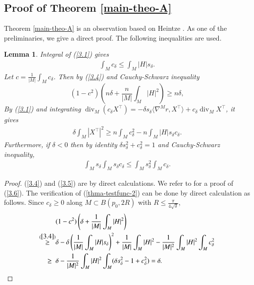\documentclass{amsart}
\numberwithin{equation}{section}
\newtheorem{lem}[theo]{Lemma}
\theoremstyle{remark}
\renewcommand{\(}{\left(}
\renewcommand{\)}{\right)}
\renewcommand{\~}{\tilde}
\renewcommand{\-}{\overline}
\renewcommand{\d}{\delta}
\newcommand{\divv}{\operatorname{div }}
\begin{document}
\subsection{Proof of Theorem \ref{main-theo-A}}

Theorem \ref{main-theo-A} is an observation based on Heintze \cite{Heintze1988}. As one of the preliminaries, we give a direct proof. The following inequalities are used.
\begin{lem}
	Integral of (\ref{3.1}) gives
	\begin{align}\label{3.4}
	\int_M c_\d \leq \int_M |H| s_\d.
	\end{align}
	Let $c=\frac{1}{|M|}\int_M c_\d$. Then by (\ref{3.4}) and Cauchy-Schwarz inequality
	\begin{equation}\label{thma-testfunc-2}
	(1-c^2)\(n\d+\frac{n}{|M|}\int_M |H|^2\)\ge n\delta,
	\end{equation}
	By (\ref{3.1}) and integrating $\divv_M (c_\d X^\top)=-\delta s_\d\langle  \nabla^M r,X^\top\rangle + c_\d \divv_M X^\top$, it gives
	\begin{align}\label{3.5}
	\d \int_M |X^\top|^2 \geq n\int_M c_\d^2-n\int_M |H| s_\d c_\d.
	\end{align}
	Furthermore, if $\d<0$ then by identity $\d s_\d^2+c_\d^2=1$ and Cauchy-Schwarz inequality,
	\begin{align}\label{3.6}
	\int_M s_\d \int_M s_\d c_\d \leq \int_M s_\d^2 \int_M c_\d.
	\end{align}
\end{lem}
\begin{proof}
	(\ref{3.4}) and (\ref{3.5}) are by direct calculations. We refer to \cite[Lemma 2.8]{Heintze1988} for a proof of (\ref{3.6}). The verification of (\ref{thma-testfunc-2}) can be done by direct calculation as follows.
	Since $c_\d\ge 0$ along $M\subset B(p_0,2R)$ with $R\le\frac{\pi}{4\sqrt{\delta}}$,
	\begin{align*}
	&(1-c^2)\(\d+\frac{1}{|M|}\int_M |H|^2\) \\
	\overset{(\ref{3.4})}{\geq} & \d-\d \(\frac{1}{|M|}\int_M |H| s_\d\)^2 +\frac{1}{|M|}\int_M |H|^2-\frac{1}{|M|^2}\int_M |H|^2 \int_M c_\d^2 \\
	\geq  \;\;& \d-\frac{1}{|M|^2}\int_M |H|^2\int_M ( \d s_\d^2-1+c_\d^2)=\d.
	\end{align*}
\end{proof}
\end{document}
